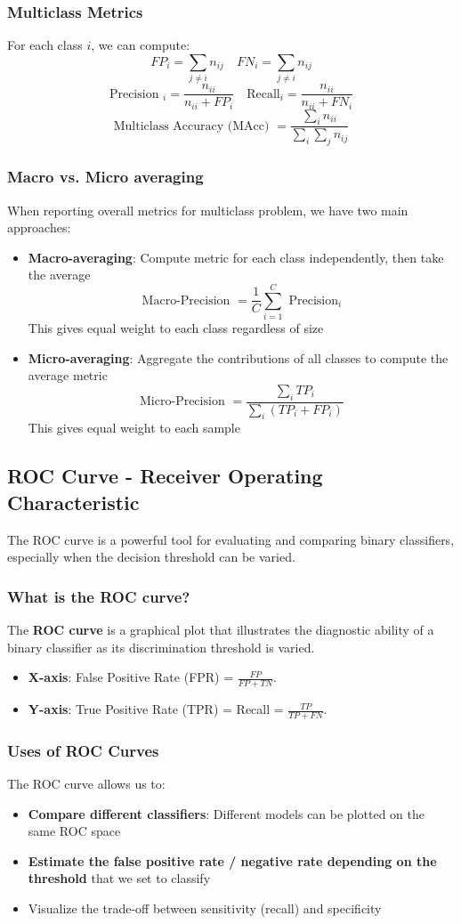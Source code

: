\documentclass[a4paper]{article}
\theoremstyle{definition}
\begin{document}
\subsubsection{Multiclass Metrics}
For each class \( i \), we can compute:
\[
  FP_i = \sum_{j \neq i} n_{ij} \quad FN_i = \sum_{j \neq i} n_{ij}
\]
\[
  \text{Precision }_i = \frac{n_{ii}}{n_{ii} + FP_i} \quad \text{Recall}_i = \frac{n_{ii}}{n_{ii} + FN_i}
\]
\[
  \text{Multiclass Accuracy (MAcc) } = \frac{\sum_{i} n_{ii}}{\sum_{i} \sum_{j} n_{ij}}
\]
\subsubsection{Macro vs. Micro averaging}
When reporting overall metrics for multiclass problem, we have two main approaches:
\begin{itemize}
    \item \textbf{Macro-averaging}: Compute metric for each class independently, then take the average
    \[
      \text{Macro-Precision } = \frac{1}{C} \sum_{i = 1}^{C} \text{ Precision}_i
    \]
    This gives equal weight to each class regardless of size
    \item \textbf{Micro-averaging}: Aggregate the contributions of all classes to compute the average metric
    \[
      \text{Micro-Precision } = \frac{\sum_{i} TP_i}{\sum_{i}(TP_i + FP_i)}
    \]
    This gives equal weight to each sample
\end{itemize}
\subsection{ROC Curve - Receiver Operating Characteristic}
The ROC curve is a powerful tool for evaluating and comparing binary classifiers, especially when the decision threshold can be varied.
\subsubsection{What is the ROC curve?}
The \textbf{ROC curve} is a graphical plot that illustrates the diagnostic ability of a binary classifier as its discrimination threshold is varied.
\begin{itemize}
    \item \textbf{X-axis}: False Positive Rate (FPR) = \( \frac{FP}{FP + TN} \).
    \item \textbf{Y-axis}: True Positive Rate (TPR) = Recall = \( \frac{TP}{TP + FN} \).
\end{itemize}
\subsubsection{Uses of ROC Curves}
The ROC curve allows us to:
\begin{itemize}
    \item \textbf{Compare different classifiers}: Different models can be plotted on the same ROC space 
    \item \textbf{Estimate the false positive rate / negative rate depending on the threshold} that we set to classify 
    \item Visualize the trade-off between sensitivity (recall) and specificity
\end{itemize}
\end{document}
